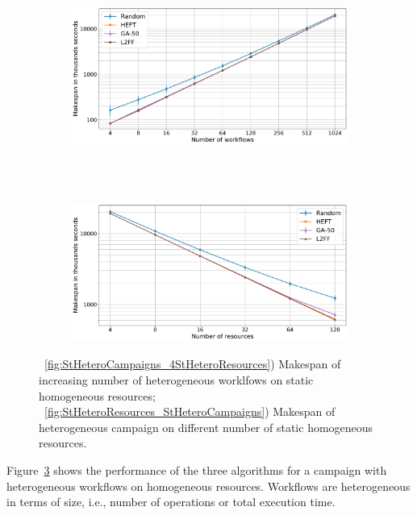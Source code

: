 \begin{figure}[ht!]
    \centering
    \begin{subfigure}[b]{0.85\textwidth}
        \includegraphics[width=.95\textwidth]{figures/campaign/StHeteroCampaigns_4StHomoResources.pdf}
        \caption{}
        \label{fig:StHeteroCampaigns_4StHomoResources}
    \end{subfigure}\\
    ~ 
    \begin{subfigure}[b]{0.85\textwidth}
        \includegraphics[width=.95\textwidth]{figures/campaign/HomogeResources_StHeteroCampaigns.pdf}
        \caption{}
        \label{fig:StHomoResources_StHeteroCampaigns}
    \end{subfigure}
    \caption{~\ref{fig:StHeteroCampaigns_4StHeteroResources}) Makespan of increasing number of heterogeneous worklfows on static homogeneous resources;
        ~\ref{fig:StHeteroResources_StHeteroCampaigns}) Makespan of heterogeneous campaign on different number of static homogeneous resources.}
    \label{fig:het_het_analysis}
\end{figure}

Figure~\ref{fig:het_het_analysis} shows the performance of the three algorithms for a campaign with heterogeneous workflows on homogeneous resources.
Workflows are heterogeneous in terms of size, i.e., number of operations or total execution time.

